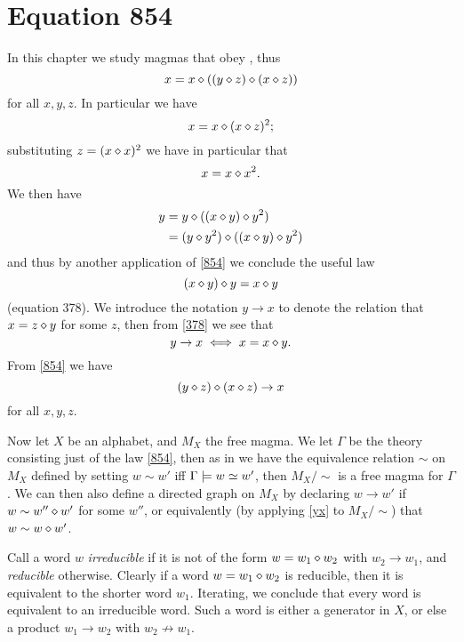 \chapter{Equation 854}\label{854-chapter}

In this chapter we study magmas that obey , thus
\begin{equation}\label{854}
  x = x \diamond ((y \diamond z) \diamond (x \diamond z))
\end{equation}
for all $x,y,z$.  In particular we have
$$ x = x \diamond (x \diamond z)^2;$$
substituting $z  = (x \diamond x)^2$ we have in particular that
$$ x = x \diamond x^2.$$
We then have
\begin{align*}
  y &= y \diamond ((x \diamond y) \diamond y^2) \\
  & = (y \diamond y^2) \diamond ((x \diamond y) \diamond y^2)
\end{align*}
and thus by another application of \eqref{854} we conclude the useful law
\begin{equation}\label{378}
   (x \diamond y) \diamond y = x \diamond y
\end{equation}
(equation 378).  We introduce the notation $y \to x$ to denote the relation that $x = z \diamond y$ for some $z$, then from \eqref{378} we see that
\begin{equation}\label{yx}
  y \to x \iff x = x \diamond y.
\end{equation}
From \eqref{854} we have
\begin{equation}\label{854-alt}
  (y \diamond z) \diamond (x \diamond z) \to x
\end{equation}
for all $x,y,z$.

Now let $X$ be an alphabet, and $M_X$ the free magma.  We let $\Gamma$ be the theory consisting just of the law \eqref{854}, then as in  we have the equivalence relation $\sim$ on $M_X$ defined by setting $w \sim w'$ iff $\Gamma \models w \simeq w'$, then $M_X/\sim$ is a free magma for $\Gamma$.  We can then also define a directed graph on $M_X$ by declaring $w \to w'$ if $w \sim w'' \diamond w'$ for some $w''$, or equivalently (by applying \eqref{yx} to $M_X/\sim$) that $w \sim w \diamond w'$.

Call a word $w$ \emph{irreducible} if it is not of the form $w = w_1 \diamond w_2$ with $w_2 \to w_1$, and \emph{reducible} otherwise.  Clearly if a word $w = w_1 \diamond w_2$ is reducible, then it is equivalent to the shorter word $w_1$.  Iterating, we conclude that every word is equivalent to an irreducible word.  Such a word is either a generator in $X$, or else a product $w_1 \to w_2$ with $w_2 \not \to w_1$.


